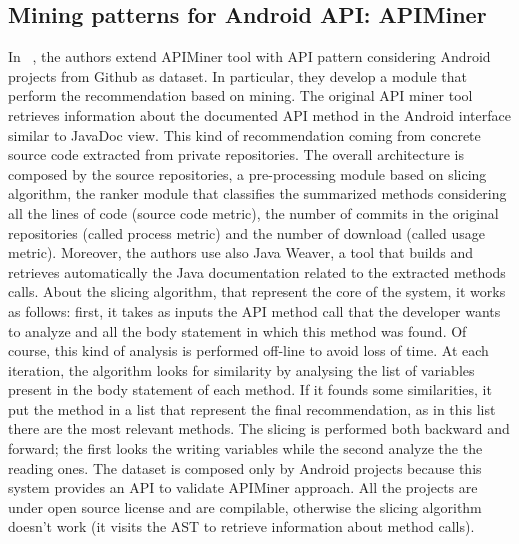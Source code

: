 \subsection{Mining patterns for Android  API: APIMiner}
In  ~\cite{borges_mining_2015}, the authors extend APIMiner tool with API pattern considering Android projects from Github as dataset. In particular, they develop a module that perform the recommendation based on mining. The original API miner tool   ~\cite{montandon_documenting_2013}  retrieves information about the documented API method in the Android interface similar to JavaDoc view. This kind of recommendation coming from  concrete source code extracted from private repositories. The overall  architecture is composed by the source repositories, a pre-processing module based on slicing algorithm, the ranker module that classifies the summarized methods  considering all the lines of  code (source code metric), the number of commits in the original repositories (called process metric) and the number of download (called usage metric). Moreover, the authors use also Java Weaver, a tool that builds and retrieves automatically the Java documentation related to the extracted methods calls. About the slicing algorithm, that represent the core of the system, it works as follows: first, it takes as inputs the API method call that the developer wants to analyze and all the body statement in which this method was found. Of course, this kind of analysis is performed off-line to avoid loss of time. At each iteration, the algorithm looks for similarity by analysing the list of variables present in the body statement of each method. If it founds some similarities, it put the method in a list that represent the final recommendation, as in this list there are the most relevant methods. The slicing is performed both backward and forward; the first looks the writing variables while the second analyze the the reading ones. The dataset is composed only by Android projects because this system provides an API to validate APIMiner approach. All the projects are under open source license and are compilable, otherwise the slicing algorithm doesn't work (it visits the AST to retrieve information about method calls). \\
